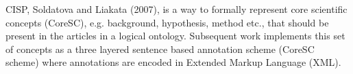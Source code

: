 CISP, Soldatova and Liakata (2007), is a way to formally represent core
scientific concepts (CoreSC), e.g. background, hypothesis, method etc., that
should be present in the articles in a logical
ontology\cite{soldatova2007ontology}. Subsequent work implements this set of
concepts as a three layered sentence based annotation scheme (CoreSC scheme)
where annotations are encoded in Extended Markup Language
(XML)\cite{LIAKATA10.644}.
